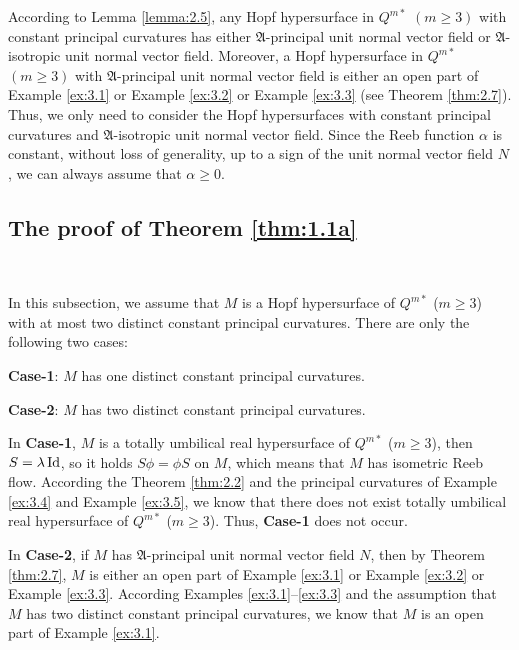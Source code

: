 \documentclass[reqno]{amsart}%
\theoremstyle{definition}
\numberwithin{equation}{section}
\begin{document}
According to Lemma \ref{lemma:2.5}, any Hopf hypersurface in $Q^{m*}$ $(m\ge3)$ with constant
principal curvatures has either $\mathfrak{A}$-principal unit normal vector field or $\mathfrak{A}$-isotropic unit normal vector field. Moreover,
a Hopf hypersurface in $Q^{m*}$ $(m\ge3)$ with $\mathfrak{A}$-principal unit normal vector field is either an open part of Example \ref{ex:3.1} or Example \ref{ex:3.2} or Example \ref{ex:3.3}
(see Theorem \ref{thm:2.7}). Thus, we only need to consider the Hopf hypersurfaces with constant principal curvatures and $\mathfrak{A}$-isotropic unit normal vector field. Since the Reeb function $\alpha$ is  
constant, without loss of generality, up to a sign of the unit normal vector field $N$, we can always assume that $\alpha\geq0$.


\subsection{The proof of Theorem \ref{thm:1.1a}}\label{sect:5.1}~

In this subsection, we assume that $M$ is a Hopf hypersurface of $Q^{m*}$ ($m\geq3$) with at most two distinct constant principal curvatures. There are only the following two cases: 

{\bf Case-1}: $M$ has one distinct constant principal curvatures.

{\bf Case-2}: $M$ has two distinct constant principal curvatures.

In {\bf Case-1}, $M$ is a totally umbilical real hypersurface of $Q^{m*}$ ($m\geq3$), 
then $S=\lambda\,{\rm Id}$, so it holds $S\phi=\phi S$ on $M$, which means that $M$ has isometric Reeb flow. According the Theorem \ref{thm:2.2} and the principal curvatures of Example \ref{ex:3.4} and
Example \ref{ex:3.5}, we know that there does not exist totally umbilical real hypersurface of $Q^{m*}$ ($m\geq3$). Thus,  {\bf Case-1} does not occur. 

In {\bf Case-2}, if $M$ has $\mathfrak{A}$-principal unit normal vector field $N$, then by Theorem \ref{thm:2.7}, $M$ is either an open part of Example \ref{ex:3.1} or Example \ref{ex:3.2} or Example \ref{ex:3.3}. According Examples \ref{ex:3.1}--\ref{ex:3.3} and the assumption
that $M$ has two distinct constant principal curvatures, we
know that $M$ is an open part of Example \ref{ex:3.1}.
\end{document}
